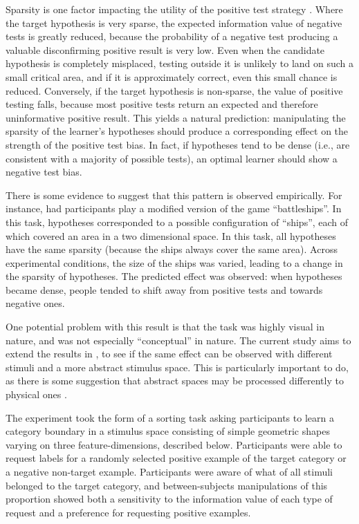\documentclass[10pt,letterpaper]{article}
\begin{document}
Sparsity is one factor impacting the utility of the positive test strategy \cite{klayman1987confirmation, navarro2011sparsecat}. Where the target hypothesis is very sparse, the expected information value of negative tests is greatly reduced, because the probability of a negative test producing a valuable disconfirming positive result is very low. %
Even when the candidate hypothesis is completely misplaced, testing outside it is unlikely to land on such a small critical area, and if it is approximately correct, even this small chance is reduced. Conversely, if the target hypothesis is non-sparse, the value of positive testing falls, because most positive tests return an expected and therefore uninformative positive result. This yields a natural prediction: manipulating the sparsity of the learner's hypotheses should produce a corresponding effect on the strength of the positive test bias. In fact, if hypotheses tend to be dense (i.e., are consistent with a majority of possible tests), an optimal learner should show a negative test bias. 

There is some evidence to suggest that this pattern is observed empirically. For instance,   had participants play a modified version of the game ``battleships''. In this task, hypotheses corresponded to a possible configuration of ``ships'', each of which covered an area in a two dimensional space. In this task, all hypotheses have the same sparsity (because the ships always cover the same area). Across experimental conditions, the size of the ships was varied, leading to a change in the sparsity of hypotheses. The predicted effect was observed: when hypotheses became dense, people tended to shift away from positive tests and towards negative ones. 

One potential problem with this result is that the task was highly visual in nature, and was not especially ``conceptual'' in nature. The current study aims to extend the results in , to see if the same effect can be observed with different stimuli and a more abstract stimulus space. This is particularly important to do, as there is some suggestion that  abstract spaces may be processed differently to physical ones \cite{cherubini2010questionasymmetry}.

The experiment took the form of a sorting task asking participants to learn a category boundary in a stimulus space consisting of simple geometric shapes varying on three feature-dimensions, described below. Participants were able to request labels for a randomly selected positive example of the target category or a negative non-target example. Participants were aware of what   of all stimuli belonged to the target category, and between-subjects manipulations of this proportion showed both a sensitivity to the information value of each type of request and a preference for requesting positive examples.
\end{document}
